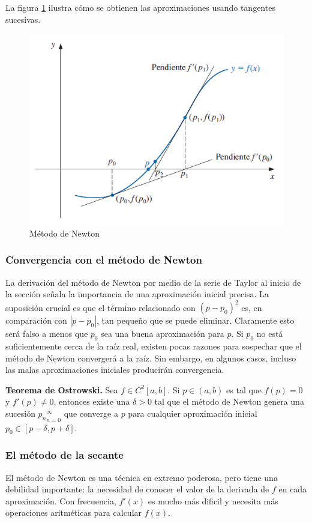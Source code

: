 La figura \ref{fig: Metodo de Newton} ilustra cómo se obtienen las aproximaciones usando tangentes sucesivas.

\begin{figure}[h]
    \centering
    \includegraphics[width = 0.5 \textwidth]{Imagenes/6 - Metodo de Newton.png}
    \caption{Método de Newton}
    \label{fig: Metodo de Newton}
\end{figure}

\subsubsection{Convergencia con el método de Newton}

La derivación del método de Newton por medio de la serie de Taylor al inicio de la sección señala la importancia de una aproximación inicial precisa. La suposición crucial es que el término relacionado con $(p - p_0)^2$ es, en comparación con $|p - p_0|$, tan pequeño que se puede eliminar. Claramente esto será falso a menos que $p_0$ sea una buena aproximación para $p$. Si $p_0$ no está suficientemente cerca de la raíz real, existen pocas razones para sospechar que el método de Newton convergerá a la raíz. Sin embargo, en algunos casos, incluso las malas aproximaciones iniciales producirán convergencia.

\begin{theorem}
    \textbf{Teorema de Ostrowski.} Sea $f \in C^2 [a, b]$. Si $p \in (a, b)$ es tal que $f(p) = 0$ y $f'(p) \neq 0$, entonces existe una $\delta > 0$ tal que el método de Newton genera una sucesión ${p_n}_{n = 0}^\infty$ que converge a $p$ para cualquier aproximación inicial $p_0 \in [p - \delta, p + \delta]$.
\end{theorem}

\subsubsection{El método de la secante}

El método de Newton es una técnica en extremo poderosa, pero tiene una debilidad importante: la necesidad de conocer el valor de la derivada de $f$ en cada aproximación. Con frecuencia, $f'(x)$ es mucho más dificil y necesita más operaciones aritméticas para calcular $f(x)$. 

